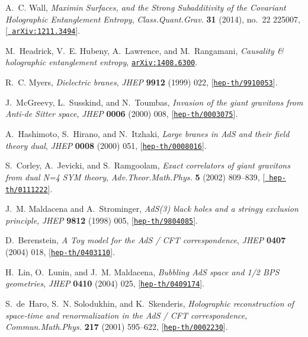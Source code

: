 \documentclass[12pt]{article}
\begin{document}
\begin{thebibliography}{100}
A.~C. Wall, {\it {Maximin Surfaces, and the Strong Subadditivity of the
  Covariant Holographic Entanglement Entropy}},  {\em Class.Quant.Grav.} {\bf
  31} (2014), no.~22 225007, [\href{http://xxx.lanl.gov/abs/1211.3494}{{\tt
  arXiv:1211.3494}}].

M.~Headrick, V.~E. Hubeny, A.~Lawrence, and M.~Rangamani, {\it {Causality \&
  holographic entanglement entropy}},
  \href{http://xxx.lanl.gov/abs/1408.6300}{{\tt arXiv:1408.6300}}.

R.~C. Myers, {\it {Dielectric branes}},  {\em JHEP} {\bf 9912} (1999) 022,
  [\href{http://xxx.lanl.gov/abs/hep-th/9910053}{{\tt hep-th/9910053}}].

J.~McGreevy, L.~Susskind, and N.~Toumbas, {\it {Invasion of the giant gravitons
  from Anti-de Sitter space}},  {\em JHEP} {\bf 0006} (2000) 008,
  [\href{http://xxx.lanl.gov/abs/hep-th/0003075}{{\tt hep-th/0003075}}].

A.~Hashimoto, S.~Hirano, and N.~Itzhaki, {\it {Large branes in AdS and their
  field theory dual}},  {\em JHEP} {\bf 0008} (2000) 051,
  [\href{http://xxx.lanl.gov/abs/hep-th/0008016}{{\tt hep-th/0008016}}].

S.~Corley, A.~Jevicki, and S.~Ramgoolam, {\it {Exact correlators of giant
  gravitons from dual N=4 SYM theory}},  {\em Adv.Theor.Math.Phys.} {\bf 5}
  (2002) 809--839, [\href{http://xxx.lanl.gov/abs/hep-th/0111222}{{\tt
  hep-th/0111222}}].

J.~M. Maldacena and A.~Strominger, {\it {AdS(3) black holes and a stringy
  exclusion principle}},  {\em JHEP} {\bf 9812} (1998) 005,
  [\href{http://xxx.lanl.gov/abs/hep-th/9804085}{{\tt hep-th/9804085}}].

D.~Berenstein, {\it {A Toy model for the AdS / CFT correspondence}},  {\em
  JHEP} {\bf 0407} (2004) 018,
  [\href{http://xxx.lanl.gov/abs/hep-th/0403110}{{\tt hep-th/0403110}}].

H.~Lin, O.~Lunin, and J.~M. Maldacena, {\it {Bubbling AdS space and 1/2 BPS
  geometries}},  {\em JHEP} {\bf 0410} (2004) 025,
  [\href{http://xxx.lanl.gov/abs/hep-th/0409174}{{\tt hep-th/0409174}}].

S.~de~Haro, S.~N. Solodukhin, and K.~Skenderis, {\it {Holographic
  reconstruction of space-time and renormalization in the AdS / CFT
  correspondence}},  {\em Commun.Math.Phys.} {\bf 217} (2001) 595--622,
  [\href{http://xxx.lanl.gov/abs/hep-th/0002230}{{\tt hep-th/0002230}}].


\end{thebibliography}
\end{document}
